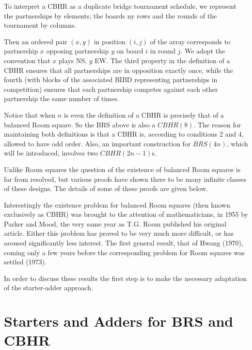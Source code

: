 \documentclass[
  12pt,
  a4paper]{book}
\begin{document}
To interpret a CBHR as a duplicate bridge tournament schedule, we
represent the partnerships by elements, the boards ny rows and the
rounds of the tournament by columns.

Then an ordered pair \((x,y)\) in position \((i,j)\) of the array
corresponds to partnership \(x\) opposing partnership \(y\) on board
\(i\) in round \(j\). We adopt the convention that \(x\) plays NS, \(y\)
EW. The third property in the definition of a CBHR ensures that all
partnerships are in opposition exactly once, while the fourth (with
blocks of the associated BIBD representing partnerships in competition)
ensures that each partnership competes against each other partnership
the same number of times.

Notice that when \(n\) is even the definition of a CBHR is precisely
that of a balanced Room square. So the BRS above is also a \(CBHR(8)\).
The reason for maintaining both definitions is that a CBHR is, according
to conditions 2 and 4, allowed to have odd order. Also, an important
construction for \(BRS(4n)\), which will be introduced, involves two
\(CBHR(2n-1)\)s.

Unlike Room squares the question of the existence of balanced Room
squares is far from resolved, but various proofs have shown there to be
many infinite classes of these designs. The details of some of these
proofs are given below.

Interestingly the existence problem for balanced Room squares (then
known exclusively as CBHR) was brought to the attention of
mathematicians, in 1955 by Parker and Mood, the very same year as T.G.
Room published his original article. Either this problem has proved to
be very much more difficult, or has aroused significantly less interest.
The first general result, that of Hwang (1970), coming only a few years
before the corresponding problem for Room squares was settled (1973).

In order to discuss these results the first step is to make the
necessary adaptation of the starter-adder approach.

\hypertarget{starters-and-adders-for-brs-and-cbhr}{%
\section{Starters and Adders for BRS and
CBHR}\label{starters-and-adders-for-brs-and-cbhr}}
\end{document}
